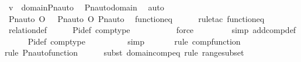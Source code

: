 \begin{isabellebody}
\ {\isachardoublequoteopen}v\ {\isasymin}\ domain{\isacharparenleft}{\kern0pt}Pn{\isacharunderscore}{\kern0pt}auto{\isacharparenleft}{\kern0pt}{\isasympi}{\isacharparenright}{\kern0pt}{\isacharparenright}{\kern0pt}{\isachardoublequoteclose}\ \isamarkupfalse%
\ Pn{\isacharunderscore}{\kern0pt}auto{\isacharunderscore}{\kern0pt}domain\ \isamarkupfalse%
\ auto\isanewline
\ \ \isamarkupfalse%
\isanewline
\isanewline
\ \ \isamarkupfalse%
\ {\isachardoublequoteopen}Pn{\isacharunderscore}{\kern0pt}auto{\isacharparenleft}{\kern0pt}{\isasympi}\ O\ {\isasymtau}{\isacharparenright}{\kern0pt}\ {\isacharequal}{\kern0pt}\ Pn{\isacharunderscore}{\kern0pt}auto{\isacharparenleft}{\kern0pt}{\isasympi}{\isacharparenright}{\kern0pt}\ O\ Pn{\isacharunderscore}{\kern0pt}auto{\isacharparenleft}{\kern0pt}{\isasymtau}{\isacharparenright}{\kern0pt}{\isachardoublequoteclose}\ \isamarkupfalse%
\ function{\isacharunderscore}{\kern0pt}eq\isanewline
\ \ \ \ \isamarkupfalse%
\ {\isacharparenleft}{\kern0pt}rule{\isacharunderscore}{\kern0pt}tac\ function{\isacharunderscore}{\kern0pt}eq{\isacharparenright}{\kern0pt}\isanewline
\ \ \ \ \isamarkupfalse%
\ relation{\isacharunderscore}{\kern0pt}def\isanewline
\ \ \ \ \isamarkupfalse%
\ Pi{\isacharunderscore}{\kern0pt}def\ comp{\isacharunderscore}{\kern0pt}type\isanewline
\ \ \ \ \ \ \ \ \ \isamarkupfalse%
\ force\isanewline
\ \ \ \ \ \ \ \ \isamarkupfalse%
{\isacharparenleft}{\kern0pt}simp\ add{\isacharcolon}{\kern0pt}comp{\isacharunderscore}{\kern0pt}def{\isacharparenright}{\kern0pt}\isanewline
\ \ \ \ \isamarkupfalse%
\ Pi{\isacharunderscore}{\kern0pt}def\ comp{\isacharunderscore}{\kern0pt}type\ \isanewline
\ \ \ \ \ \ \ \isamarkupfalse%
\ simp\isanewline
\ \ \ \ \ \ \isamarkupfalse%
{\isacharparenleft}{\kern0pt}rule\ comp{\isacharunderscore}{\kern0pt}function{\isacharparenright}{\kern0pt}\isanewline
\ \ \ \ \ \ \ \isamarkupfalse%
{\isacharparenleft}{\kern0pt}rule\ Pn{\isacharunderscore}{\kern0pt}auto{\isacharunderscore}{\kern0pt}function{\isacharparenright}{\kern0pt}{\isacharplus}{\kern0pt}\isanewline
\ \ \ \ \ \isamarkupfalse%
{\isacharparenleft}{\kern0pt}subst\ domain{\isacharunderscore}{\kern0pt}comp{\isacharunderscore}{\kern0pt}eq{\isacharcomma}{\kern0pt}\ rule\ range{\isacharunderscore}{\kern0pt}subset{\isacharparenright}{\kern0pt}\isanewline
\ \ \ \ \ \isamarkupfalse%

\end{isabellebody}
